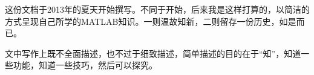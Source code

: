这份文档于2013年的夏天开始撰写。不同于开始，后来我是这样打算的，以简洁的方式呈现自己所学的MATLAB知识。一则温故知新，二则留存一份历史，如是而已。\par
文中写作上既不全面描述，也不过于细致描述，简单描述的目的在于“知”，知道一些功能，知道一些技巧，然后可以探究。
